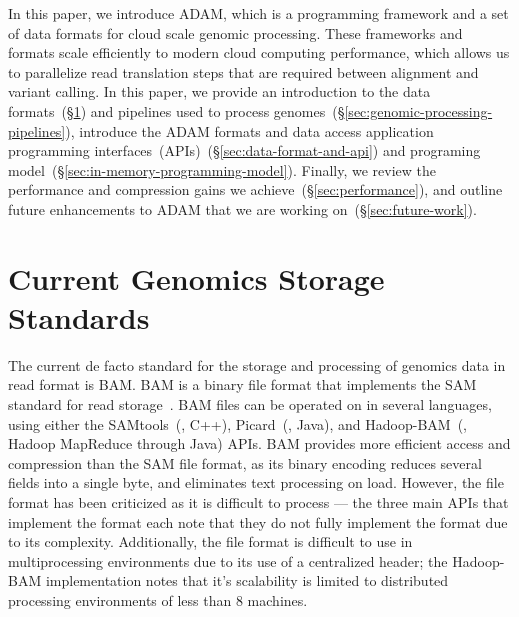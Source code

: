 \documentclass[10pt,twocolumn]{article}
\theoremstyle{plain}
\begin{document}
In this paper, we introduce ADAM, which is a programming framework and a set of data formats for cloud scale genomic
processing. These frameworks and formats scale efficiently to modern cloud computing performance, which allows us to
parallelize read translation steps that are required between alignment and variant calling. In this paper, we provide an
introduction to the data formats~(\S\ref{sec:current-genomics-storage-standards}) and pipelines used to process
genomes~(\S\ref{sec:genomic-processing-pipelines}), introduce the ADAM formats and data access
application programming interfaces~(APIs)~(\S\ref{sec:data-format-and-api}) and programing
model~(\S\ref{sec:in-memory-programming-model}). Finally, we review the performance and compression gains we
achieve~(\S\ref{sec:performance}), and outline future enhancements to ADAM that we are working on~(\S\ref{sec:future-work}).

\section{Current Genomics Storage Standards}
\label{sec:current-genomics-storage-standards}

The current de facto standard for the storage and processing of genomics data in read format is BAM. BAM is a binary file
format that implements the SAM standard for read storage~\cite{li09}. BAM files can be operated on in several languages,
using either the SAMtools~(\cite{li09}, C++), Picard~(\cite{picard}, Java), and Hadoop-BAM~(\cite{niemenmaa12}, Hadoop
MapReduce through Java) APIs. BAM provides more efficient access and compression than the SAM file format, as its binary
encoding reduces several fields into a single byte, and eliminates text processing on load. However, the file format has been
criticized as it is difficult to process --- the three main APIs that implement the format each note that they do not fully implement
the format due to its complexity. Additionally, the file format is difficult to use in multiprocessing environments due to its use
of a centralized header; the Hadoop-BAM implementation notes that it's scalability is limited to distributed processing
environments of less than 8 machines.
\end{document}
